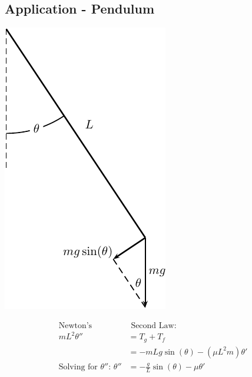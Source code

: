 \subsection*{Application - Pendulum }
\begin{minipage}[t]{0.25\linewidth}
\vspace{0pt}
\begin{center}
\includegraphics[width=1.0\linewidth]{graphics/notes_09_pendulum_diagram}
\end{center}
\end{minipage}
\begin{minipage}[t]{0.70\linewidth}
\vspace{0pt}
\begin{align*}
  \mbox{Newton's }& \mbox{ Second Law: } \\
   m  L^2 \theta'' & = T_g + T_f  \\
  & = - m L g \sin(\theta) - (\mu L^2 m) \theta' \\[3ex]
  \mbox{Solving for $\theta''$: }\theta'' & = - \frac{g}{L} \sin(\theta) - \mu 
  \theta'
\end{align*}
\end{minipage}

